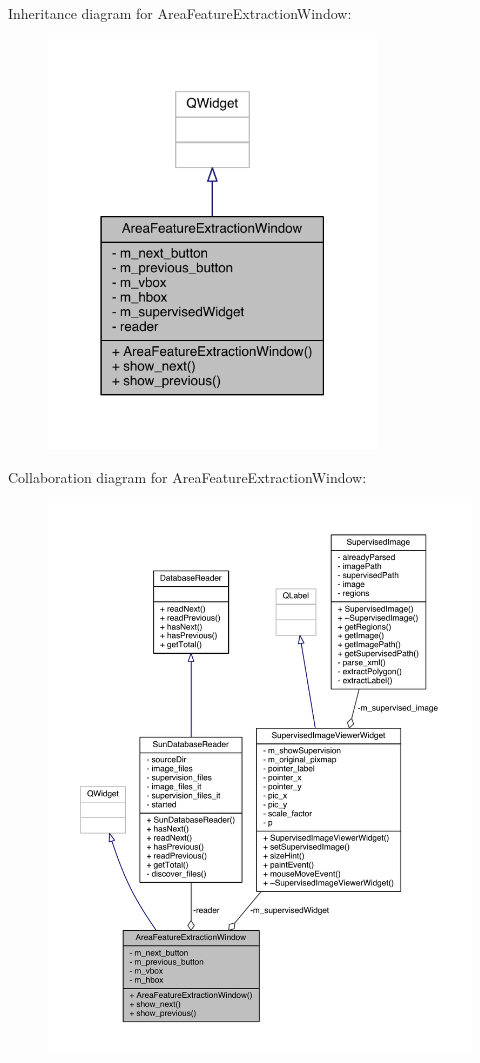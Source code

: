 Inheritance diagram for Area\+Feature\+Extraction\+Window\+:\nopagebreak
\begin{figure}[H]
\begin{center}
\leavevmode
\includegraphics[width=247pt]{class_area_feature_extraction_window__inherit__graph}
\end{center}
\end{figure}


Collaboration diagram for Area\+Feature\+Extraction\+Window\+:\nopagebreak
\begin{figure}[H]
\begin{center}
\leavevmode
\includegraphics[width=350pt]{class_area_feature_extraction_window__coll__graph}
\end{center}
\end{figure}


